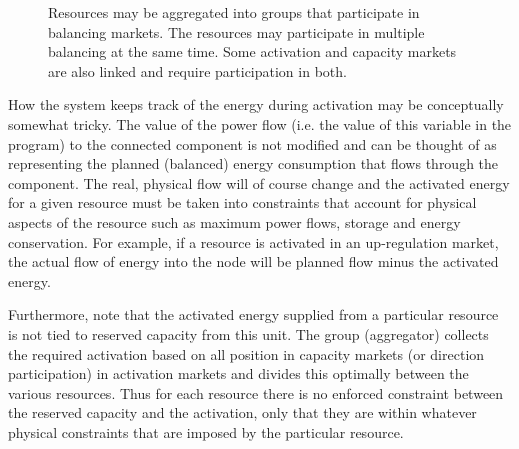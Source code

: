 \documentclass[]{report}
\begin{document}
\begin{figure}
    \centering
    \caption{Resources may be aggregated into groups that participate in balancing markets. The resources may participate in multiple balancing at the same time. Some activation and capacity markets are also linked and require participation in both.}
    \label{fig:groups}
\end{figure}

How the system keeps track of the energy during activation may be conceptually somewhat tricky. The value of the power flow (i.e. the value of this variable in the program) to the connected component is not modified and can be thought of as representing the planned (balanced) energy consumption that flows through the component. The real, physical flow will of course change and the activated energy for a given resource must be taken into constraints that account for physical aspects of the resource such as maximum power flows, storage and energy conservation. For example, if a resource is activated in an up-regulation market, the actual flow of energy into the node will be planned flow minus the activated energy. 

Furthermore, note that the activated energy supplied from a particular resource is not tied to reserved capacity from this unit. The group (aggregator) collects the required activation based on all position in capacity markets (or direction participation) in activation markets and divides this optimally between the various resources. Thus for each resource there is no enforced constraint between the reserved capacity and the activation, only that they are within whatever physical constraints that are imposed by the particular resource.
\end{document}
